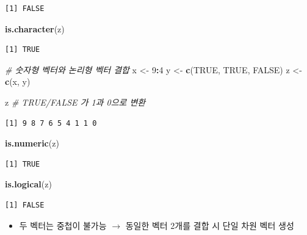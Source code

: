 \documentclass[
  11pt,
]{krantz}
\newenvironment{Shaded}{\begin{snugshade}}{\end{snugshade}}
\newcommand{\CommentTok}[1]{\textcolor[rgb]{0.37,0.37,0.37}{\textit{#1}}}
\newcommand{\DecValTok}[1]{\textcolor[rgb]{0.06,0.06,0.06}{#1}}
\newcommand{\KeywordTok}[1]{\textcolor[rgb]{0.27,0.27,0.27}{\textbf{#1}}}
\newcommand{\NormalTok}[1]{#1}
\newcommand{\OperatorTok}[1]{\textcolor[rgb]{0.43,0.43,0.43}{\textbf{#1}}}
\newcommand{\OtherTok}[1]{\textcolor[rgb]{0.37,0.37,0.37}{#1}}
\newcommand{\StringTok}[1]{\textcolor[rgb]{0.5,0.5,0.5}{#1}}
\providecommand{\tightlist}{%
  \setlength{\itemsep}{0pt}\setlength{\parskip}{0pt}}
\begin{document}
\begin{verbatim}
[1] FALSE
\end{verbatim}

\begin{Shaded}
\begin{Highlighting}[]
\KeywordTok{is.character}\NormalTok{(z)}
\end{Highlighting}
\end{Shaded}

\begin{verbatim}
[1] TRUE
\end{verbatim}

\begin{Shaded}
\begin{Highlighting}[]
\CommentTok{# 숫자형 벡터와 논리형 벡터 결합}
\NormalTok{x <-}\StringTok{ }\DecValTok{9}\OperatorTok{:}\DecValTok{4}
\NormalTok{y <-}\StringTok{ }\KeywordTok{c}\NormalTok{(}\OtherTok{TRUE}\NormalTok{, }\OtherTok{TRUE}\NormalTok{, }\OtherTok{FALSE}\NormalTok{)}
\NormalTok{z <-}\StringTok{ }\KeywordTok{c}\NormalTok{(x, y)}

\NormalTok{z }\CommentTok{# TRUE/FALSE 가 1과 0으로 변환}
\end{Highlighting}
\end{Shaded}

\begin{verbatim}
[1] 9 8 7 6 5 4 1 1 0
\end{verbatim}

\begin{Shaded}
\begin{Highlighting}[]
\KeywordTok{is.numeric}\NormalTok{(z)}
\end{Highlighting}
\end{Shaded}

\begin{verbatim}
[1] TRUE
\end{verbatim}

\begin{Shaded}
\begin{Highlighting}[]
\KeywordTok{is.logical}\NormalTok{(z)}
\end{Highlighting}
\end{Shaded}

\begin{verbatim}
[1] FALSE
\end{verbatim}

\normalsize

\begin{itemize}
\tightlist
\item
  두 벡터는 중첩이 불가능 \(\rightarrow\) 동일한 벡터 2개를 결합 시 단일 차원 벡터 생성
\end{itemize}
\end{document}
